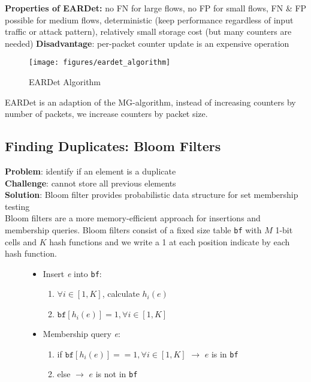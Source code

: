 \textbf{Properties of EARDet:} no FN for large flows, no FP for small flows, FN \& FP possible for medium flows, deterministic (keep performance regardless of input traffic or attack pattern), relatively small storage cost (but many counters are needed)
\textbf{Disadvantage}: per-packet counter update is an expensive operation

\begin{figure}[t!]
	\centering
	\texttt{[image: figures/eardet\_algorithm]}
	\caption{EARDet Algorithm}
	\label{fig:eardetalgorithm}
\end{figure}

EARDet is an adaption of the MG-algorithm, instead of increasing counters by number of packets, we increase counters by packet size.

\subsection{Finding Duplicates: Bloom Filters}

\textbf{Problem}: identify if an element is a duplicate\\
\textbf{Challenge}: cannot store all previous elements\\
\textbf{Solution}: Bloom filter provides probabilistic data structure for set membership testing\\

Bloom filters are a more memory-efficient approach for insertions and membership queries. Bloom filters consist of a fixed size table \texttt{bf} with $M$ 1-bit cells and $K$ hash functions and we write a 1 at each position indicate by each hash function.

\begin{figure}[hb]
	\begin{minipage}[t]{.5\textwidth} 
		\vspace{10pt} 
		\begin{itemize}
			\setlength{\itemsep}{0pt}
			\setlength{\parskip}{0pt}
			\item Insert \textit{e} into \texttt{bf}: 
			\begin{enumerate}
				\item $\forall i \in [1,K]$, calculate $h_i(e)$
				\item $\texttt{bf}[h_i(e)] = 1, \forall i \in [1,K]$
			\end{enumerate}
			\item Membership query \textit{e}:
			\begin{enumerate}
				\item if $\texttt{bf}[h_i(e)] == 1, \forall i \in [1,K]$ 
				\newline $\rightarrow$ $e$ is in \texttt{bf}
				\item else 
				\newline $\rightarrow$ $e$ is not in \texttt{bf}
			\end{enumerate}
		\end{itemize}
	\end{minipage} 
\end{figure}

